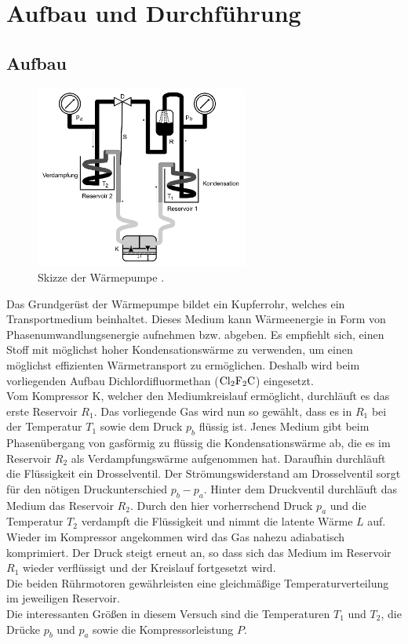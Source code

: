 \section{Aufbau und Durchführung}
\label{sec:Durchführung}
\subsection{Aufbau}

\begin{figure}[H]
  \centering
  \includegraphics[height=6cm]{skizze.png}
  \caption{Skizze der Wärmepumpe \cite{sample}.}
  \label{fig:skizze}
\end{figure}

Das Grundgerüst der Wärmepumpe bildet ein Kupferrohr, welches ein Transportmedium beinhaltet.
Dieses Medium kann Wärmeenergie in Form von Phasenumwandlungsenergie aufnehmen bzw. abgeben.
Es empfiehlt sich, einen Stoff mit möglichst hoher Kondensationswärme zu verwenden, um einen möglichst effizienten Wärmetransport zu ermöglichen.
Deshalb wird beim vorliegenden Aufbau Dichlordifluormethan ($\ce{Cl2F2C}$) eingesetzt.\\
Vom Kompressor K, welcher den Mediumkreislauf ermöglicht, durchläuft es das erste Reservoir $R_1$.
Das vorliegende Gas wird nun so gewählt, dass es in $R_1$ bei der Temperatur $T_1$ sowie dem Druck $p_b$ flüssig ist.
Jenes Medium gibt beim Phasenübergang von gasförmig zu flüssig die Kondensationswärme ab, die es im Reservoir $R_2$ als Verdampfungswärme aufgenommen hat.
Daraufhin durchläuft die Flüssigkeit ein Drosselventil.
Der Strömungswiderstand am Drosselventil sorgt für den nötigen Druckunterschied $p_b-p_a$.
Hinter dem Druckventil durchläuft das Medium das Reservoir $R_2$.
Durch den hier vorherrschend Druck $p_a$ und die Temperatur $T_2$ verdampft die Flüssigkeit und nimmt die latente Wärme $L$ auf.
Wieder im Kompressor angekommen wird das Gas nahezu adiabatisch komprimiert.
Der Druck steigt erneut an, so dass sich das Medium im Reservoir $R_1$ wieder verflüssigt und der Kreislauf fortgesetzt wird.\\
Die beiden Rührmotoren gewährleisten eine gleichmäßige Temperaturverteilung im jeweiligen Reservoir.\\
Die interessanten Größen in diesem Versuch sind die Temperaturen $T_1$ und $T_2$, die Drücke $p_b$ und $p_a$ sowie die Kompressorleistung $P$.

